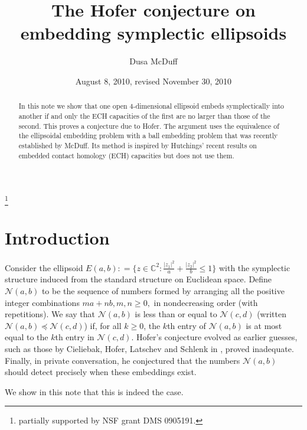 \documentclass[11pt]{amsart}
\newcommand{\1}{{{\mathchoice {\rm 1\mskip-4mu l} {\rm 1\mskip-4mu l}
{\rm 1\mskip-4.5mu l} {\rm 1\mskip-5mu l}}}}
\newcommand{\C}{{\mathbb C}}
\newcommand{\Nn}{{\mathcal N}}
\numberwithin{figure}{section}
\numberwithin{equation}{section}
\begin{document}
\title{The Hofer conjecture on embedding symplectic ellipsoids}
%
\author{Dusa McDuff} \thanks{partially supported by NSF grant DMS 0905191.}
\address{(D.~McDuff)
Department of Mathematics, 
Barnard College, Columbia University, New York, 
NY 10027-6598, USA.}
%
%
%
\date{August 8, 2010, revised November 30, 2010}

\begin{abstract} 
In this note we  show that one open $4$-dimensional ellipsoid embeds symplectically into another if and only the ECH capacities of
 the first are no larger than those of the second.  This proves a conjecture due to Hofer.
 The argument uses the equivalence of the ellipsoidal embedding 
 problem with a ball embedding problem that was recently established by McDuff.  Its method is inspired by Hutchings' recent results  on embedded contact homology (ECH) capacities but does not use them. 
\end{abstract}

\maketitle
\section{Introduction}

Consider the ellipsoid $E(a,b): = \{z\in \C^2: \frac{|z_1|^2}a + \frac{|z_2|^2}b\le 1\}$ with the symplectic structure induced from the standard structure on Euclidean space.  Define $\Nn(a,b)$ to be the sequence of numbers  formed by arranging all the positive integer combinations $ma+nb, m,n\ge 0,$ in nondecreasing order (with repetitions). 
We say that  $\Nn(a,b)$ is less than or equal to $\Nn(c,d)$ (written $\Nn(a,b)  \preccurlyeq \Nn(c,d)$) if, for all $k\ge 0$,  the $k$th entry of $\Nn(a,b)$ is at most equal to the $k$th entry in $\Nn(c,d)$.
Hofer's conjecture  evolved as 
earlier guesses, such as those by Cieliebak, Hofer, Latschev and Schlenk in \cite{CHLS}, proved inadequate.  Finally, in private conversation, he
conjectured   that the numbers 
$\Nn(a,b)$ should detect precisely when these embeddings exist. 

We show in this note that this is indeed the case.
\end{document}
